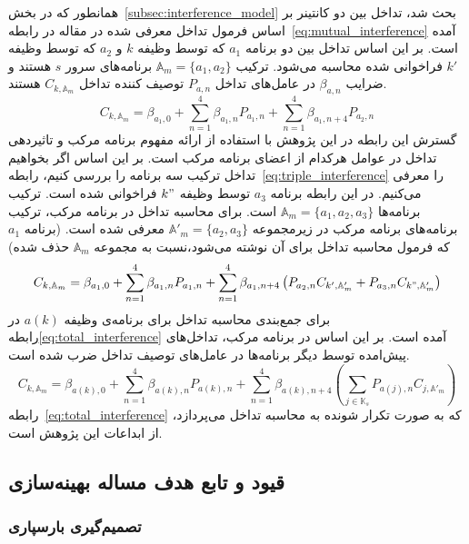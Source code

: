 همانطور که در بخش~\ref{subsec:interference_model} بحث شد، تداخل بین دو کانتینر بر اساس فرمول تداخل معرفی شده در مقاله \cite{medel2023modeling} در رابطه~\eqref{eq:mutual_interference} آمده است. بر این اساس تداخل بین دو برنامه $a_1$ که توسط وظیفه $k$ و $a_2$ که توسط وظیفه $k'$ فراخوانی شده محاسبه می‌شود. ترکیب $\mathbb{A}_m=\{a_1,a_2\}$ برنامه‌های سرور $s$ هستند و ضرایب $\beta_{a,n}$ در عامل‌های تداخل $P_{a,n}$ توصیف کننده تداخل $C_{k,\mathbb{A}_m}$ هستند.
\begin{equation} \label{eq:mutual_interference}
    C_{k,\mathbb{A}_m} = \beta_{a_1,0} + \sum_{n=1}^4 \beta_{a_1,n} P_{a_1,n} + \sum_{n=1}^4 \beta_{a_1,n+4} P_{a_2,n}
\end{equation}
گسترش این رابطه در این پژوهش با استفاده از ارائه مفهوم برنامه مرکب و تاثیردهی تداخل در عوامل هرکدام از اعضای برنامه مرکب است. بر این اساس اگر بخواهیم تداخل ترکیب سه برنامه را بررسی کنیم، رابطه~\eqref{eq:triple_interference} را معرفی می‌کنیم. در این رابطه برنامه $a_3$ توسط وظیفه $k"$ فراخوانی شده است. ترکیب برنامه‌ها $\mathbb{A}_m=\{a_1,a_2,a_3\}$ است. برای محاسبه تداخل در برنامه مرکب، ترکیب برنامه‌های برنامه مرکب در زیرمجموعه $\mathbb{A}'_m=\{a_2,a_3\}$ معرفی شده است. (برنامه $a_1$ که فرمول محاسبه تداخل برای آن نوشته می‌شود،نسبت به مجموعه $\mathbb{A}_m$ حذف شده)
\begin{equation} \label{eq:triple_interference}
    C_{k,\mathbb{A}_m} = \beta_{a_1,0} + \sum_{n=1}^4 \beta_{a_1,n} P_{a_1,n} + \sum_{n=1}^4 \beta_{a_1,n+4} \left(P_{a_2,n}C_{k',\mathbb{A}'_m} + P_{a_3,n}C_{k",\mathbb{A}'_m}\right)
\end{equation}
برای جمع‌بندی محاسبه تداخل برای برنامه‌ی وظیفه $a(k)$ در رابطه\eqref{eq:total_interference} آمده است. بر این اساس در برنامه مرکب، تداخل‌های پیش‌امده توسط دیگر برنامه‌ها در عامل‌های توصیف تداخل ضرب شده است.
\begin{equation} \label{eq:total_interference}
    C_{k,\mathbb{A}_m} = \beta_{a(k),0} + \sum_{n=1}^4 \beta_{a(k),n} P_{a(k),n} + \sum_{n=1}^4 \beta_{a(k),n+4} \left(\sum_{j \in \mathbb{K}_s} P_{a(j),n} C_{j,\mathbb{A}'_m}\right)
\end{equation}
رابطه~\eqref{eq:total_interference} که به صورت تکرار شونده به محاسبه تداخل می‌پردازد، از ابداعات این پژوهش است.

\subsection{قیود و تابع هدف مساله بهینه‌سازی}

\subsubsection{تصمیم‌گیری بارسپاری} \label{subsubsec:off_decision}

